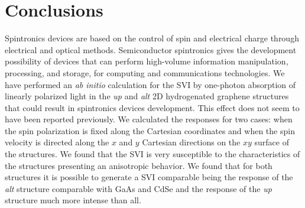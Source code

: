 \documentclass[prb,11pt,tightenlines,twocolumn,aps]{revtex4-1}
\begin{document}
\section{Conclusions} %
\label{sec:conclusions}

Spintronics devices are based on the control of spin and electrical charge
through electrical and optical methods.
% 
Semiconductor spintronics gives the development possibility of devices that can
perform high-volume information manipulation, processing, and storage, for
computing and communications technologies.\cite{awschalomNP2007} 
% 
We have performed an \emph{ab initio} calculation for the SVI by one-photon
absorption of linearly polarized light in the \emph{up} and \emph{alt} 2D
hydrogenated graphene structures that could result in spintronics devices
development. This effect does not seem to have been reported previously.
% 
We calculated the responses for two cases: when the spin polarization is fixed
along the Cartesian coordinates and when the spin velocity is directed along
the $x$ and $y$ Cartesian directions on the $xy$ surface of the structures. We
found that  the SVI is very susceptible to the characteristics of the
structures presenting an anisotropic behavior.
% 
We found that for both structures it is possible to generate a SVI comparable
being the response of the \emph{alt} structure comparable with GaAs and CdSe
and the response of the \emph{up} structure much more intense than all.
\end{document}
